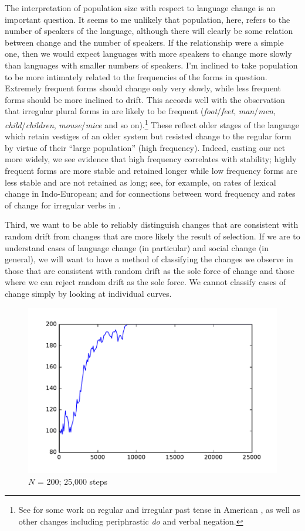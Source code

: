 \documentclass[output=paper]{langsci/langscibook}
\begin{document}
The interpretation of population size with respect to language change
is an important question.  It seems to me unlikely that population,
here, refers to the number of speakers of the language, although there
will clearly be some relation between change and the number of
speakers.  If the relationship were a simple one, then we would expect
languages with more speakers to change more slowly than languages with
smaller numbers of speakers.  I'm inclined to take population to be
more intimately related to the frequencies of the forms in question.
Extremely frequent forms should change only very slowly, while less
frequent forms should be more inclined to drift.  This accords well
with the observation that irregular plural forms in  are likely
to be frequent (\emph{foot}/\emph{feet}, \emph{man}/\emph{men},
\emph{child}/\emph{children}, \emph{mouse}/\emph{mice} and so on).\footnote{See
\citet{newberry-etal:2017} for some work on regular and irregular past tense in
American , as well as other changes including periphrastic
\emph{do} and verbal negation.}  These reflect older stages of the language
which retain vestiges of an older system but resisted change to the regular
form by virtue of their ``large population'' (high frequency).  Indeed, casting
our net more widely, we see evidence that high frequency correlates with
stability; highly frequent forms are more stable and retained longer while low
frequency forms are less stable and are not retained as long;  see, for
example, \citet{pagel-etal:2007} on rates of lexical change in Indo-European;
\citet{lieberman-etal:2007} and \citet{newberry-etal:2017} for connections
between word frequency and rates of change for irregular verbs in
.

Third, we want to be able to reliably distinguish changes that are
consistent with random drift from changes that are more likely the
result of selection.  If we are to understand cases of language change
(in particular) and social change (in general), we will want to have
a method of classifying the changes we observe in those that are
consistent with random drift as the sole force of change and those
where we can reject random drift as the sole force.   We cannot
classify cases of change simply by looking at individual curves.

\begin{figure}[ht]
    \centering
    \includegraphics[width=.8\linewidth]{./img/result.pdf}
    \caption{$N$ = 200; 25,000 steps}
    \label{RandomDrift}
\end{figure}
\end{document}
